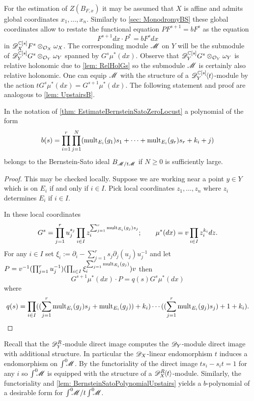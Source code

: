 \noindent
For the estimation of $Z(B_{F,x})$ it may be assumed that $X$ is affine and admits global coordinates $x_1,\ldots,x_n$.
Similarly to \cref{sec: MonodromyBS} these global coordinates allow to restate the functional equation $P F^{s+1} = b F^s$ as the equation
$$F^{s+1}dx \cdot P^* = b F^s dx $$
in $\mathscr{D}_X^{\mathbb{C}[s]} F^s \otimes_{\mathcal{O}_X}\omega_X$.
The corresponding module $\mathscr{M}$ on $Y$ will be the submodule of $ \mathscr{D}_Y^{\mathbb{C}[s]} G^s\otimes_{\mathcal{O}_Y}\omega_Y$ spanned by $G^s \mu^*(dx)$.
Observe that $ \mathscr{D}_Y^{\mathbb{C}[s]} G^s\otimes_{\mathcal{O}_Y}\omega_Y$ is relative holonomic due to \cref{lem: RelHolGs} so the submodule $\mathscr{M}$ is certainly also relative holonomic.
One can equip $\mathscr{M}$ with the structure of a $\mathscr{D}_{Y}^{\mathbb{C}[s]}\mkern-5mu\left\langle t \right\rangle$-module by the action $t G^s \mu^*(dx) = G^{s+1} \mu^*(dx)$.
The following statement and proof are analogous to \cref{lem: UpstairsB}.
\begin{lemma}\label{lem: BernsteinSatoPolynomialUpstairs}
  In the notation of \cref{thm: EstimateBernsteinSatoZeroLocust} a polynomial of the form
  $$b(s)=\prod_{i=1}^r \prod_{j=1}^N(\operatorname{mult}_{E_i}(g_1)\allowbreak s_1 + \cdots + \operatorname{mult}_{E_i}(g_r)\allowbreak s_r + k_i + j)$$
  belongs to the Bernstein-Sato ideal $B_{\mathscr{M}/t\mathscr{M}}$ if $N\geq 0$ is sufficiently large.
\end{lemma}
\begin{proof}
  This may be checked locally.
  Suppose we are working near a point $y\in Y$ which is on $E_i$ if and only if $i\in I$.
  Pick local coordinates $z_1,\ldots,z_n$ where $z_i$ determines $E_i$ if $i\in I$.

  In these local coordinates
  $$G^s = \prod_{j=1}^r u_j^{s_j} \prod_{i\in I} z_i^{\sum_{j=1}^r \operatorname{mult}_{E_i}(g_j)s_j};\qquad \mu^*(dx) = v \prod_{i\in I} z_i^{k_i} dz.$$
  For any $i\in I$ set $\xi_i := \partial_i - \sum_{j=1}^{r}s_j\partial_j(u_j)u_j^{-1}$ and let $P = v^{-1}(\prod_{j=1}^r u_j^{-1}) (\prod_{i\in I}\xi_i^{\sum_{j=1}^r\operatorname{mult}_{E_i}(g_j)}) v$ then
  $$G^{s+1}\mu^*(dx) \cdot P =  q(s) G^s \mu^*(dx) $$
  where
  $$q(s) = \prod_{i\in I}((\sum_{j=1}^r \operatorname{mult}_{E_i}(g_j)s_j + \operatorname{mult}_{E_i}(g_j)) + k_i)\cdots((\sum_{j=1}^r \operatorname{mult}_{E_i}(g_j)s_j) + 1 + k_i ).$$
\end{proof}
Recall that the $\mathscr{D}_Y^R$-module direct image computes the $\mathscr{D}_Y$-module direct image with additional structure.
In particular the $\mathscr{D}_X$-linear endomorphism $t$ induces a endomorphism on $\int^0 \mkern -8mu\mathscr{M}$.
By the functoriality of the direct image $ts_i - s_it = 1$ for any $i$ so $\int^0 \mkern -8mu\mathscr{M}$ is equipped with the structure of a $\mathscr{D}_X^R\mkern-5mu\left\langle t \right\rangle$-module.
Similarly, the functoriality and \cref{lem: BernsteinSatoPolynomialUpstairs} yields a $b$-polynomial of a desirable form for $\int^0 \mkern -8mu \mathscr{M}/t\int^0 \mkern -8mu\mathscr{M}$.

